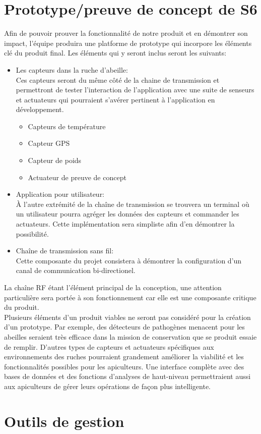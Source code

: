 \documentclass[12pt,titlepage=true,letterpaper,pointlessnumbers,headings=normal,captions=nooneline]{scrartcl}
\begin{document}
\section{Prototype/preuve de concept de S6}
Afin de pouvoir prouver la fonctionnalité de notre produit et en démontrer son impact, l'équipe produira une platforme de prototype qui incorpore les éléments clé du produit final. Les éléments qui y seront inclus seront les suivants:
\begin{itemize}
	\item Les capteurs dans la ruche d'abeille:\\
	Ces capteurs seront du même côté de la chaine de transmission et permettront de tester l'interaction de l'application avec une suite de senseurs et actuateurs qui pourraient s'avérer pertinent à l'application en développement.
	\begin{itemize}
		\item Capteurs de température
		\item Capteur GPS
		\item Capteur de poids
		\item Actuateur de preuve de concept
	\end{itemize}
	\item Application pour utilisateur:\\
	À l'autre extrémité de la chaîne de transmission se trouvera un terminal où un utilisateur pourra agréger les données des capteurs et commander les actuateurs. Cette implémentation sera simpliste afin d'en démontrer la possibilité.
	\item Chaîne de transmission sans fil:\\
	Cette composante du projet consistera à démontrer la configuration d'un canal de communication bi-directionel.
\end{itemize}
\medskip
La chaîne RF étant l'élément principal de la conception, une attention particulière sera portée à son fonctionnement car elle est une composante critique du produit.\\
Plusieurs éléments d'un produit viables ne seront pas considéré pour la création d'un prototype. Par exemple, des détecteurs de pathogènes menacent pour les abeilles seraient très efficace dans la mission de conservation que se produit essaie de remplir. 
D'autres types de capteurs et actuateurs spécifiques aux environnements des ruches pourraient grandement améliorer la viabilité et les fonctionnalités possibles pour les apiculteurs.
Une interface complète avec des bases de données et des fonctions d'analyses de haut-niveau permettraient aussi aux apiculteurs de gérer leurs opérations de façon plus intelligente.

\section{Outils de gestion}
\end{document}
